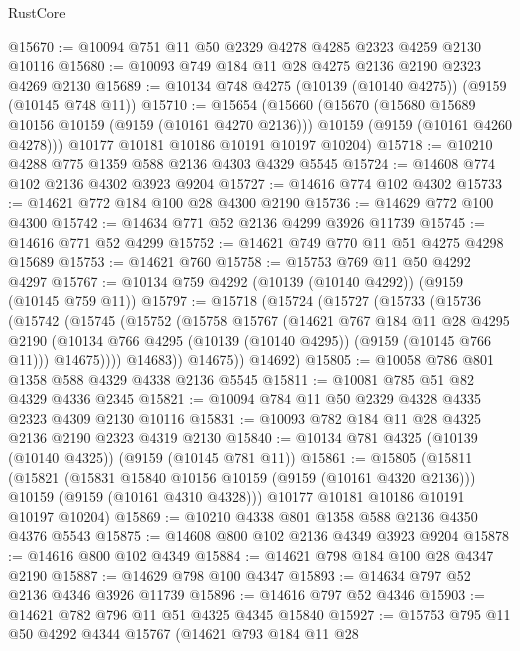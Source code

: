 \begin{lexlean}{RustCore}
\begin{coremodule}
@15670 := @10094 @751 @11 @50 @2329 @4278 @4285 @2323 @4259 @2130 @10116
@15680 := @10093 @749 @184 @11 @28 @4275 @2136 @2190 @2323 @4269 @2130
@15689 := @10134 @748 @4275 (@10139 (@10140 @4275)) (@9159 (@10145 @748 @11))
@15710 := @15654
    (@15660
      (@15670
        (@15680 @15689 @10156 @10159 (@9159 (@10161 @4270 @2136)))
        @10159
        (@9159 (@10161 @4260 @4278)))
      @10177
      @10181
      @10186
      @10191
      @10197
      @10204)
@15718 := @10210 @4288 @775 @1359 @588 @2136 @4303 @4329 @5545
@15724 := @14608 @774 @102 @2136 @4302 @3923 @9204
@15727 := @14616 @774 @102 @4302
@15733 := @14621 @772 @184 @100 @28 @4300 @2190
@15736 := @14629 @772 @100 @4300
@15742 := @14634 @771 @52 @2136 @4299 @3926 @11739
@15745 := @14616 @771 @52 @4299
@15752 := @14621 @749 @770 @11 @51 @4275 @4298 @15689
@15753 := @14621 @760
@15758 := @15753 @769 @11 @50 @4292 @4297
@15767 := @10134 @759 @4292 (@10139 (@10140 @4292)) (@9159 (@10145 @759 @11))
@15797 := @15718
    (@15724
      (@15727
        (@15733
          (@15736
            (@15742
              (@15745
                (@15752
                  (@15758
                    @15767
                    (@14621
                      @767
                      @184
                      @11
                      @28
                      @4295
                      @2190
                      (@10134 @766 @4295 (@10139 (@10140 @4295)) (@9159 (@10145 @766 @11)))
                      @14675))))
              @14683))
          @14675))
      @14692)
@15805 := @10058 @786 @801 @1358 @588 @4329 @4338 @2136 @5545
@15811 := @10081 @785 @51 @82 @4329 @4336 @2345
@15821 := @10094 @784 @11 @50 @2329 @4328 @4335 @2323 @4309 @2130 @10116
@15831 := @10093 @782 @184 @11 @28 @4325 @2136 @2190 @2323 @4319 @2130
@15840 := @10134 @781 @4325 (@10139 (@10140 @4325)) (@9159 (@10145 @781 @11))
@15861 := @15805
    (@15811
      (@15821
        (@15831 @15840 @10156 @10159 (@9159 (@10161 @4320 @2136)))
        @10159
        (@9159 (@10161 @4310 @4328)))
      @10177
      @10181
      @10186
      @10191
      @10197
      @10204)
@15869 := @10210 @4338 @801 @1358 @588 @2136 @4350 @4376 @5543
@15875 := @14608 @800 @102 @2136 @4349 @3923 @9204
@15878 := @14616 @800 @102 @4349
@15884 := @14621 @798 @184 @100 @28 @4347 @2190
@15887 := @14629 @798 @100 @4347
@15893 := @14634 @797 @52 @2136 @4346 @3926 @11739
@15896 := @14616 @797 @52 @4346
@15903 := @14621 @782 @796 @11 @51 @4325 @4345 @15840
@15927 := @15753
    @795
    @11
    @50
    @4292
    @4344
    @15767
    (@14621
      @793
      @184
      @11
      @28

\end{coremodule}
\end{lexlean}
